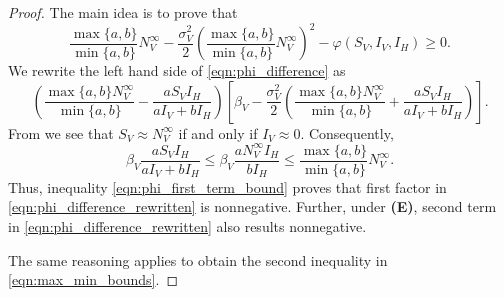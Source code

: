\begin{proof}
    The main idea is to prove that
    \begin{equation}
        \label{eqn:phi_difference}
        \frac{
            \max\{a,b\}
        }{
            \min \{a, b\}
        }
          N_V ^ {\infty}
        - 
        \frac{\sigma_V ^ 2}{2}
        \left(
            \frac{
                \max\{a,b\}
            }{
                \min \{a, b\}
            } N_V ^ {\infty}
        \right) ^ 2
        -
        \varphi (S_V, I_V, I_H) 
        \geq 
        0.
    \end{equation}
    We rewrite the left hand side of \eqref{eqn:phi_difference} as
%
    \begin{equation}
    \label{eqn:phi_difference_rewritten}
        \left(
            \frac{
                \max \{a,b\}
            N_V ^ \infty
            }{
                \min \{a,b\}
            }
%            
            -
            \frac{ a S_V I_H}{a I_V + b I_H}
        \right)
        \left[
            \beta_V
            -
            \frac{\sigma_V ^ 2}{2}
            \left(
                \frac{
                    \max \{a,b\}
                    N_V ^ \infty
                }{
                    \min \{a,b\}
                }
                +
                \frac{a S_V I_H}{a I_V + b I_H}
            \right)
        \right].
    \end{equation}
%
    From  we see that
    $S_V \approx N_V ^ \infty$ if and only if $I_V \approx 0$. Consequently,
    \begin{equation}\label{eqn:phi_first_term_bound}
        \beta_V
            \frac{a S_V I_H}{a I_V + b I_H}
        \leq
         \beta_V
            \frac{a N_V ^ \infty I_H}{b I_H}
        \leq
            \frac{
                \max \{ a,b \} 
            }{
                \min\{ a, b\}
            }
             N_V ^ \infty.
    \end{equation}
    Thus, inequality \eqref{eqn:phi_first_term_bound} proves
    that first factor in \eqref{eqn:phi_difference_rewritten} is nonnegative.
    Further, under \textsc{ \textbf{(E)}},
    second term in \eqref{eqn:phi_difference_rewritten} also results 
    nonnegative.
    
        The same reasoning applies to obtain the second inequality in 
    \eqref{eqn:max_min_bounds}.
\end{proof}


%
